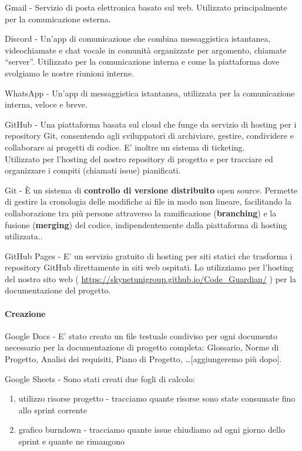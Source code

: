 \documentclass[12pt, a4paper]{article}
\begin{document}
 {Gmail} - Servizio di posta elettronica basato sul web. Utilizzato
principalmente per la comunicazione esterna.

 {Discord} - Un'app di comunicazione che combina messaggistica
istantanea, videochiamate e chat vocale in comunità organizzate per
argomento, chiamate ``server''. Utilizzato per la comunicazione interna
e come la piattaforma dove svolgiamo le nostre riunioni interne.

 {WhatsApp} - Un'app di messaggistica istantanea, utilizzata per la
comunicazione interna, veloce e breve.

 {GitHub} - Una piattaforma basata sul cloud che funge da servizio di
hosting per i repository Git, consentendo agli sviluppatori di
archiviare, gestire, condividere e collaborare ai progetti di codice. E'
inoltre un sistema di ticketing.\\
Utilizzato per l'hosting del nostro repository di progetto e per
tracciare ed organizzare i compiti (chiamati issue) pianificati.

 {Git} - È un sistema di \textbf{controllo di versione distribuito}
open source. Permette di gestire la cronologia delle modifiche ai file
in modo non lineare, facilitando la collaborazione tra più persone
attraverso la ramificazione (\textbf{branching}) e la fusione
(\textbf{merging}) del codice, indipendentemente dalla piattaforma di
hosting utilizzata..

 {GitHub Pages} - E' un servizio gratuito di hosting per siti statici
che trasforma i repository GitHub direttamente in siti web ospitati. Lo
utilizziamo per l'hosting del nostro sito web (
\href{https://skynetunigroup.github.io/Code_Guardian/}{ {https://skynetunigroup.github.io/Code\_Guardian/}}
) per la documentazione del progetto.

\paragraph{Creazione}

 {Google Docs} - E' stato creato un file testuale condiviso per ogni
documento necessario per la documentazione di progetto completa:
Glossario, Norme di Progetto, Analisi dei requisiti, Piano di Progetto,
\ldots{[}aggiungeremo più dopo{]}.

 {Google Sheets} - Sono stati creati due fogli di calcolo:

\begin{enumerate}
\def\labelenumi{\arabic{enumi}.}
\item
  utilizzo risorse progetto - tracciamo quante risorse sono state
  consumate fino allo sprint corrente
\item
  grafico burndown - tracciamo quante issue chiudiamo ad ogni giorno
  dello sprint e quante ne rimangono
\end{enumerate}
\end{document}
